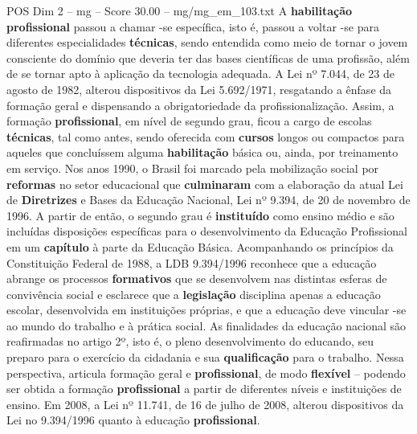 \begin{textsample}{POS Dim 2 – mg – Score 30.00 – mg/mg\_em\_103.txt}
A \textbf{habilitação} \textbf{profissional} passou a chamar -se específica, isto é, passou a voltar -se para diferentes especialidades \textbf{técnicas}, sendo entendida como meio de tornar o jovem consciente do domínio que deveria ter das bases científicas de uma profissão, além de se tornar apto à aplicação da tecnologia adequada.
A Lei nº 7.044, de 23 de agosto de 1982, alterou dispositivos da Lei 5.692/1971, resgatando a ênfase da formação geral e dispensando a obrigatoriedade da profissionalização.
Assim, a formação \textbf{profissional}, em nível de segundo grau, ficou a cargo de escolas \textbf{técnicas}, tal como antes, sendo oferecida com \textbf{cursos} longos ou compactos para aqueles que concluíssem alguma \textbf{habilitação} básica ou, ainda, por treinamento em serviço.
Nos anos 1990, o Brasil foi marcado pela mobilização social por \textbf{reformas} no setor educacional que \textbf{culminaram} com a elaboração da atual Lei de \textbf{Diretrizes} e Bases da Educação Nacional, Lei nº 9.394, de 20 de novembro de 1996.
A partir de então, o segundo grau é \textbf{instituído} como ensino médio e são incluídas disposições específicas para o desenvolvimento da Educação Profissional em um \textbf{capítulo} à parte da Educação Básica.
Acompanhando os princípios da Constituição Federal de 1988, a LDB 9.394/1996 reconhece que a educação abrange os processos \textbf{formativos} que se desenvolvem nas distintas esferas de convivência social e esclarece que a \textbf{legislação} disciplina apenas a educação escolar, desenvolvida em instituições próprias, e que a educação deve vincular -se ao mundo do trabalho e à prática social.
As finalidades da educação nacional são reafirmadas no artigo 2º, isto é, o pleno desenvolvimento do educando, seu preparo para o exercício da cidadania e sua \textbf{qualificação} para o trabalho.
Nessa perspectiva, articula formação geral e \textbf{profissional}, de modo \textbf{flexível} – podendo ser obtida a formação \textbf{profissional} a partir de diferentes níveis e instituições de ensino.
Em 2008, a Lei nº 11.741, de 16 de julho de 2008, alterou dispositivos da Lei no 9.394/1996 quanto à educação \textbf{profissional}.

\end{textsample}
